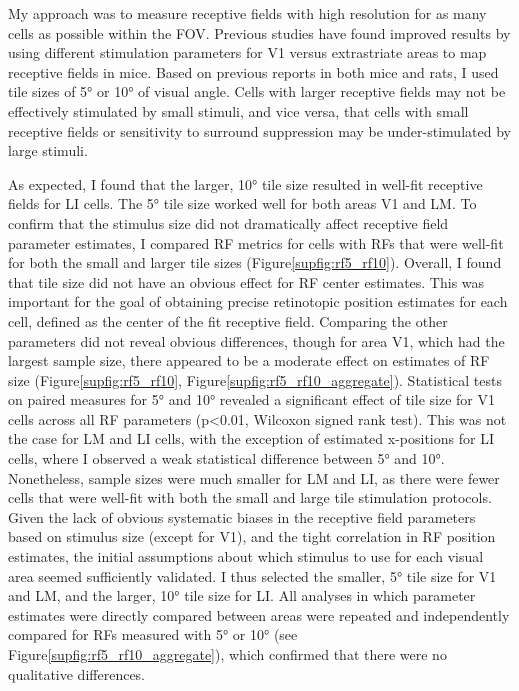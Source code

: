 My approach was to measure receptive fields with high resolution for as many cells as possible within the FOV. Previous studies have found improved results by using different stimulation parameters for V1 versus extrastriate areas to map receptive fields in mice\cite{DeVries2020, Allen2016}. Based on previous reports in both mice and rats\cite{Girman1999a, Niell2008,Vermaercke2014,Tafazoli2017,DeVries2020}, I used tile sizes of \ang{5} or \ang{10} of visual angle. Cells with larger receptive fields may not be effectively stimulated by small stimuli, and vice versa, that cells with small receptive fields or sensitivity to surround suppression may be under-stimulated by large stimuli. 

As expected, I found that the larger, \ang{10} tile size resulted in well-fit receptive fields for LI cells. The \ang{5} tile size worked well for both areas V1 and LM. To confirm that the stimulus size did not dramatically affect receptive field parameter estimates, I compared RF metrics for cells with RFs that were well-fit for both the small and larger tile sizes (Figure\ref{supfig:rf5_rf10}). Overall, I found that tile size did not have an obvious effect for RF center estimates. This was important for the goal of obtaining precise retinotopic position estimates for each cell, defined as the center of the fit receptive field. Comparing the other parameters did not reveal obvious differences, though for area V1, which had the largest sample size, there appeared to be a moderate effect on estimates of RF size (Figure\ref{supfig:rf5_rf10}, Figure\ref{supfig:rf5_rf10_aggregate}). Statistical tests on paired measures for \ang{5} and \ang{10} revealed a significant effect of tile size for V1 cells across all RF parameters (p<0.01, Wilcoxon signed rank test). This was not the case for LM and LI cells, with the exception of estimated x-positions for LI cells, where I observed a weak statistical difference between \ang{5} and \ang{10}. Nonetheless, sample sizes were much smaller for LM and LI, as there were fewer cells that were well-fit with both the small and large tile stimulation protocols. Given the lack of obvious systematic biases in the receptive field parameters based on stimulus size (except for V1), and the tight correlation in RF position estimates, the initial assumptions about which stimulus to use for each visual area seemed sufficiently validated. I thus selected the smaller, \ang{5} tile size for V1 and LM, and the larger, \ang{10} tile size for LI. All analyses in which parameter estimates were directly compared between areas were repeated and independently compared for RFs measured with \ang{5} or \ang{10} (see Figure\ref{supfig:rf5_rf10_aggregate}), which confirmed that there were no qualitative differences. 

